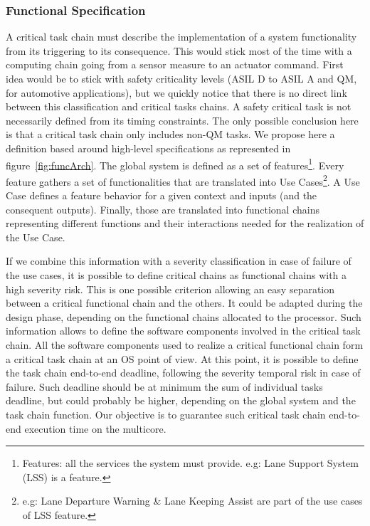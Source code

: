 \documentclass[french, a4paper, 11pt, twoside, pdftex]{StyleThese}
\begin{document}
        \subsubsection{Functional Specification} 
            A critical task chain must describe the implementation of a system functionality from its triggering to its consequence. This would stick most of the time with a computing chain going from a sensor measure to an actuator command. First idea would be to stick with safety criticality levels (ASIL D to ASIL A and QM, for automotive applications), but we quickly notice that there is no direct link between this classification and critical tasks chains. A safety critical task is not necessarily defined from its timing constraints. The only possible conclusion here is that a critical task chain only includes non-QM tasks. 
            \smallbreak
            We propose here a definition based around high-level specifications as represented in figure~\ref{fig:funcArch}. The global system is defined as a set of features\footnote{Features: all the services the system must provide. e.g: Lane Support System (LSS) is a feature.}. Every feature gathers a set of functionalities that are translated into Use Cases\footnote{e.g: Lane Departure Warning \& Lane Keeping Assist are part of the use cases of LSS feature.}. A Use Case defines a feature behavior for a given context and inputs (and the consequent outputs). Finally, those are translated into functional chains representing different functions and their interactions needed for the realization of the Use Case. 
            
            If we combine this information with a severity classification in case of failure of the use cases, it is possible to define critical chains as functional chains with a high severity risk. This is one possible criterion allowing an easy separation between a critical functional chain and the others. It could be adapted during the design phase, depending on the functional chains allocated to the processor. 
            \smallbreak
            Such information allows to define the software components involved in the critical task chain. All the software components used to realize a critical functional chain form a critical task chain at an OS point of view. At this point, it is possible to define the task chain end-to-end deadline, following the severity temporal risk in case of failure. Such deadline should be at minimum the sum of individual tasks deadline, but could probably be higher, depending on the global system and the task chain function. Our objective is to guarantee such critical task chain end-to-end execution time on the multicore.
\ifdefined{}
\else


\end{document}

